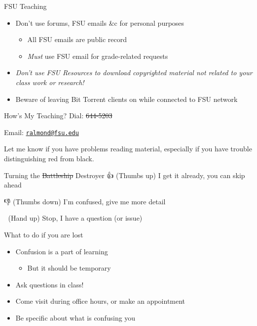 \documentclass[
  ignorenonframetext,
]{beamer}
\providecommand{\tightlist}{%
  \setlength{\itemsep}{0pt}\setlength{\parskip}{0pt}}
\begin{document}
\begin{frame}{FSU Teaching}
\protect\hypertarget{fsu-teaching}{}
\begin{itemize}
\tightlist
\item
  Don't use forums, FSU emails \&c for personal purposes

  \begin{itemize}
  \tightlist
  \item
    All FSU emails are public record
  \item
    \emph{Must} use FSU email for grade-related requests
  \end{itemize}
\item
  \emph{Don't use FSU Resources to download copyrighted material not
  related to your class work or research!}
\item
  Beware of leaving Bit Torrent clients on while connected to FSU
  network
\end{itemize}
\end{frame}

\begin{frame}{How's My Teaching?}
\protect\hypertarget{hows-my-teaching}{}
Dial: \st{644-5203}

Email: \href{mailto:ralmond@fsu.edu}{\nolinkurl{ralmond@fsu.edu}}

Let me know if you have problems reading material, especially if you
have trouble distinguishing red from black.
\end{frame}

\begin{frame}{Turning the \st{Battleship} Destroyer}
\protect\hypertarget{turning-the-battleship-destroyer}{}
👍 (Thumbs up) I get it already, you can skip ahead

👎 (Thumbs down) I'm confused, give me more detail

👏 (Hand up) Stop, I have a question (or issue)

What to do if you are lost

\begin{itemize}
\tightlist
\item
  Confusion is a part of learning

  \begin{itemize}
  \tightlist
  \item
    But it should be temporary
  \end{itemize}
\item
  Ask questions in class!
\item
  Come visit during office hours, or make an appointment
\item
  Be specific about what is confusing you
\end{itemize}
\end{frame}
\end{document}
